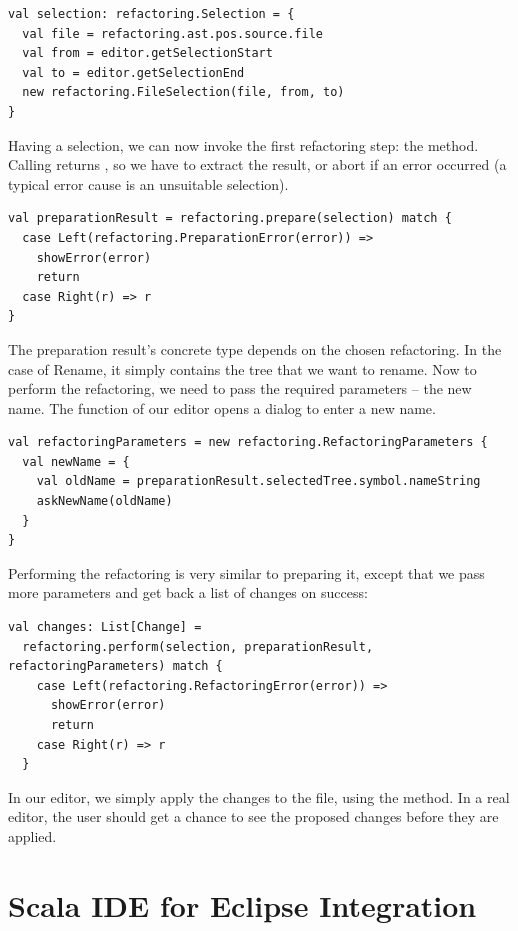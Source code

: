 \documentclass[10pt,a4paper,oneside]{scrreprt}
\begin{document}
\begin{lstlisting}
val selection: refactoring.Selection = {
  val file = refactoring.ast.pos.source.file
  val from = editor.getSelectionStart
  val to = editor.getSelectionEnd
  new refactoring.FileSelection(file, from, to)
}
\end{lstlisting}

Having a selection, we can now invoke the first refactoring step: the  method. Calling  returns , so we have to extract the result, or abort if an error occurred (a typical error cause is an unsuitable selection).

\begin{lstlisting}
val preparationResult = refactoring.prepare(selection) match {
  case Left(refactoring.PreparationError(error)) => 
    showError(error)
    return
  case Right(r) => r
}
\end{lstlisting}

The preparation result's concrete type depends on the chosen refactoring. In the case of Rename, it simply contains the tree that we want to rename. Now to perform the refactoring, we need to pass the required parameters -- the new name. The  function of our editor opens a dialog to enter a new name.

\begin{lstlisting}
val refactoringParameters = new refactoring.RefactoringParameters {
  val newName = {
    val oldName = preparationResult.selectedTree.symbol.nameString
    askNewName(oldName)
  }
}
\end{lstlisting}

Performing the refactoring is very similar to preparing it, except that we pass more parameters and get back a list of changes on success:

\begin{lstlisting}
val changes: List[Change] = 
  refactoring.perform(selection, preparationResult, refactoringParameters) match {
    case Left(refactoring.RefactoringError(error)) => 
      showError(error)
      return
    case Right(r) => r
  }
\end{lstlisting}

In our editor, we simply apply the changes to the file, using the  method. In a real editor, the user should get a chance to see the proposed changes before they are applied.

\section{Scala IDE for Eclipse Integration}
\end{document}
